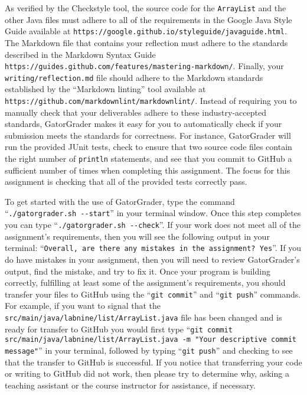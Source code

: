 \documentclass[11pt]{article}
\newcommand{\mainprogram}{\lstinline{ArrayList}}
\newcommand{\mainprogramsource}{\lstinline{src/main/java/labnine/list/ArrayList.java}}
\newcommand{\reflection}{\lstinline{writing/reflection.md}}
\newcommand{\gatorgraderstart}{\command{./gatorgrader.sh --start}}
\newcommand{\gatorgradercheck}{\command{./gatorgrader.sh --check}}
\newcommand{\gitcommit}{\command{git commit}}
\newcommand{\gitpush}{\command{git push}}
\newcommand{\gitcommitmainprogram}{\command{git commit src/main/java/labnine/list/ArrayList.java -m "Your
descriptive commit message"}}
\newcommand{\command}[1]{``\lstinline{#1}''}
\newcommand{\program}[1]{\lstinline{#1}}
\newcommand{\url}[1]{\lstinline{#1}}
\newcommand{\step}[1]{``{#1}''}
\begin{document}
As verified by the Checkstyle tool, the source code for the \mainprogram{} and
the other Java files must adhere to all of the requirements in the Google Java
Style Guide available at
\url{https://google.github.io/styleguide/javaguide.html}. The Markdown file that
contains your reflection must adhere to the standards described in the Markdown
Syntax Guide \url{https://guides.github.com/features/mastering-markdown/}.
Finally, your \reflection{} file should adhere to the Markdown standards
established by the \step{Markdown linting} tool available at
\url{https://github.com/markdownlint/markdownlint/}. Instead of requiring you to
manually check that your deliverables adhere to these industry-accepted
standards, GatorGrader makes it easy for you to automatically check if your
submission meets the standards for correctness. For instance, GatorGrader will
run the provided JUnit tests, check to ensure that two source code files contain
the right number of \program{println} statements, and see that you commit to
GitHub a sufficient number of times when completing this assignment. The focus
for this assignment is checking that all of the provided tests correctly pass.

To get started with the use of GatorGrader, type the command \gatorgraderstart{}
in your terminal window. Once this step completes you can type
\gatorgradercheck{}. If your work does not meet all of the assignment's
requirements, then you will see the following output in your terminal:
\command{Overall, are there any mistakes in the assignment? Yes}. If you do have
mistakes in your assignment, then you will need to review GatorGrader's output,
find the mistake, and try to fix it. Once your program is building correctly,
fulfilling at least some of the assignment's requirements, you should transfer
your files to GitHub using the \gitcommit{} and \gitpush{} commands. For
example, if you want to signal that the \mainprogramsource{} file has been
changed and is ready for transfer to GitHub you would first type
\gitcommitmainprogram{} in your terminal, followed by typing \gitpush{} and
checking to see that the transfer to GitHub is successful. If you notice that
transferring your code or writing to GitHub did not work, then please try to
determine why, asking a teaching assistant or the course instructor for
assistance, if necessary.
\end{document}
